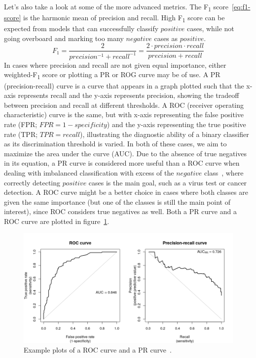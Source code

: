 Let's also take a look at some of the more advanced metrics. The F\textsubscript{1} score~\eqref{eq:f1-score}
is the harmonic mean of precision and recall. High F\textsubscript{1} score can be expected from models
that can successfully classify $positive$ cases,
while not going overboard and marking too many $negative$ cases as $positive$.
\begin{equation}
F_1 = \frac{2}{precision^{-1} + recall^{-1}} = \frac{2 \cdot precision \cdot recall}{precision + recall}
\label{eq:f1-score}
\end{equation}
In cases where precision and recall are not given equal importance, either weighted-F\textsubscript{1} score
or plotting a PR or ROG curve may be of use.
A PR (precision-recall) curve is a curve that appears in a graph plotted such that the x-axis represents recall
and the y-axis represents precision, showing the tradeoff between precision and recall at different thresholds.
A ROC (receiver operating characteristic) curve is the same, but with x-axis representing the false positive rate
(FPR; $FPR = 1 - specificity$) and the y-axis representing the true positive rate (TPR; $TPR = recall$),
illustrating the diagnostic ability of a binary classifier as its discrimination threshold is varied.
In both of these cases, we aim to maximize the area under the curve (AUC).
Due to the absence of true negatives in its equation, a PR curve is considered more useful than a ROC curve when dealing
with imbalanced classification with excess of the $negative$ class~\cite{sofaer2019area},
where correctly detecting $positive$ cases is the main goal,
such as a virus test or cancer detection. A ROC curve might be a better choice in cases
where both classes are given the same importance (but one of the classes is still the main point of interest),
since ROC considers true negatives as well. Both a PR curve and a ROC curve
are plotted in figure~\ref{fig:rog-pr-curves}.

\begin{figure}[!ht]
\centering
\includegraphics[width=\linewidth]{obrazky-figures/roc_pr-1.png}
\caption{Example plots of a ROC curve and a PR curve~\cite{barbosa_2020}.}
\label{fig:rog-pr-curves}
\end{figure}




